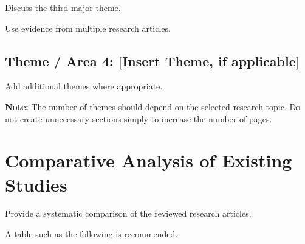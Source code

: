 \documentclass[12pt,a4paper]{article}
\begin{document}
Discuss the third major theme.

Use evidence from multiple research articles.


\subsection{Theme / Area 4: [Insert Theme, if applicable]}

Add additional themes where appropriate.

\textbf{Note:} The number of themes should depend on the selected research topic. Do not create unnecessary sections simply to increase the number of pages.



\section{Comparative Analysis of Existing Studies}

Provide a systematic comparison of the reviewed research articles.

A table such as the following is recommended.



\begin{table}[H]

\caption{Comparative analysis of the reviewed research studies}
\label{tab:comparative-analysis}


\end{table}
\end{document}
